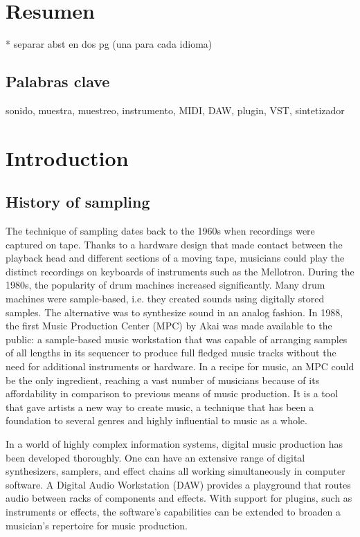 \documentclass[12pt , a4paper]{article}
\begin{document}
	\section{Resumen}
	* separar abst en dos pg (una para cada idioma)
	
	\subsection{Palabras clave}
	sonido, muestra, muestreo, instrumento, MIDI, DAW, plugin, VST, sintetizador
	


	\newpage
	\section{Introduction}
	\subsection{History of sampling}
	
	The technique of sampling dates back to the 1960s when recordings were captured on tape. Thanks to a hardware design that made contact between the playback head and different sections of a moving tape, musicians could play the distinct recordings on keyboards of instruments such as the Mellotron. During the 1980s, the popularity of drum machines increased significantly. Many drum machines were sample-based, i.e. they created sounds using digitally stored samples. The alternative was to synthesize sound in an analog fashion. In 1988, the first Music Production Center (MPC) by Akai was made available to the public: a sample-based music workstation that was capable of arranging samples of all lengths in its sequencer to produce full fledged music tracks without the need for additional instruments or hardware. In a recipe for music, an MPC could be the only ingredient, reaching a vast number of musicians because of its affordability in comparison to previous means of music production. It is a tool that gave artists a new way to create music, a technique that has been a foundation to several genres and highly influential to music as a whole.
	\par	
	In a world of highly complex information systems, digital music production has been developed thoroughly. One can have an extensive range of digital synthesizers, samplers, and effect chains all working simultaneously in computer software. A Digital Audio Workstation (DAW) provides a playground that routes audio between racks of components and effects. With support for plugins, such as instruments or effects, the software's capabilities can be extended to broaden a musician's repertoire for music production. 
\end{document}
